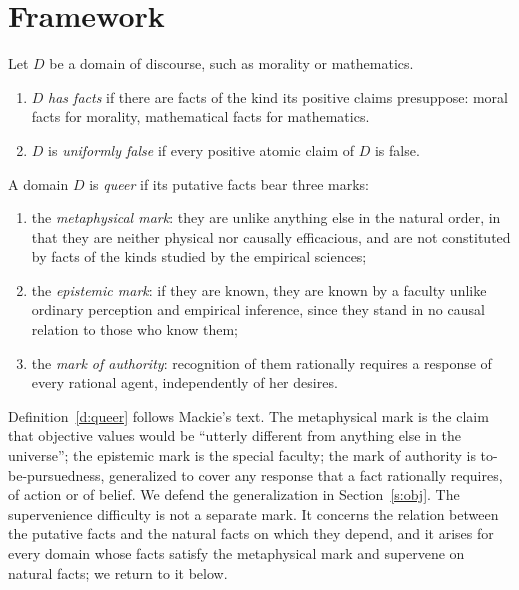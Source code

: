\documentclass{situationist-preprint}
\begin{document}
\section{Framework}

\begin{definition}\label{d:facts}
Let $D$ be a domain of discourse, such as morality or mathematics.
\begin{enumerate}[label=(\alph*)]
\item $D$ \emph{has facts} if there are facts of the kind its positive claims presuppose: moral facts for morality, mathematical facts for mathematics.
\item $D$ is \emph{uniformly false} if every positive atomic claim of $D$ is false.
\end{enumerate}
\end{definition}

\begin{definition}[Queerness]\label{d:queer}
A domain $D$ is \emph{queer} if its putative facts bear three marks:
\begin{enumerate}[label=(\alph*)]
\item the \emph{metaphysical mark}: they are unlike anything else in the natural order, in that they are neither physical nor causally efficacious, and are not constituted by facts of the kinds studied by the empirical sciences;
\item the \emph{epistemic mark}: if they are known, they are known by a faculty unlike ordinary perception and empirical inference, since they stand in no causal relation to those who know them;
\item the \emph{mark of authority}: recognition of them rationally requires a response of every rational agent, independently of her desires.
\end{enumerate}
\end{definition}

Definition~\ref{d:queer} follows Mackie's text. The metaphysical mark is the claim that objective values would be \enquote{utterly different from anything else in the universe}; the epistemic mark is the special faculty; the mark of authority is to-be-pursuedness, generalized to cover any response that a fact rationally requires, of action or of belief. We defend the generalization in Section~\ref{s:obj}. The supervenience difficulty is not a separate mark. It concerns the relation between the putative facts and the natural facts on which they depend, and it arises for every domain whose facts satisfy the metaphysical mark and supervene on natural facts; we return to it below.
\end{document}

